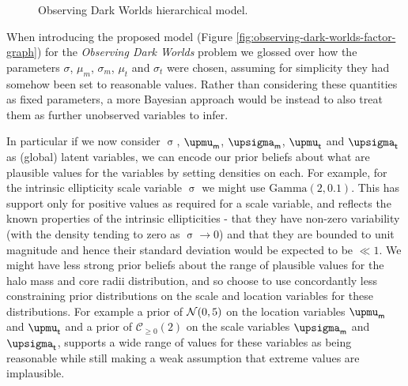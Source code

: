 \begin{figure}
\caption[Observing Dark Worlds hierarchical model.]{Observing Dark Worlds hierarchical model.} %
\label{fig:odw-hierarchical-factor-graph}
\end{figure}

When introducing the proposed model (Figure \ref{fig:observing-dark-worlds-factor-graph}) for the \emph{Observing Dark Worlds} problem we glossed over how the parameters $\sigma$, $\mu_m$, $\sigma_m$, $\mu_t$ and $\sigma_t$ were chosen, assuming for simplicity they had somehow been set to reasonable values. Rather than considering these quantities as fixed parameters, a more Bayesian approach would be instead to also treat them as further unobserved variables to infer.

In particular if we now consider $\upsigma$, $\upmu_{\rvar{m}}$, $\upsigma_{\rvar{m}}$, $\upmu_{\rvar{t}}$ and $\upsigma_{\rvar{t}}$ as (global) latent variables, we can encode our prior beliefs about what are plausible values for the variables by setting densities on each. For example, for the intrinsic ellipticity scale variable $\upsigma$ we might use $\mathrm{Gamma}(2,0.1)$. This has support only for positive values as required for a scale variable, and reflects the known properties of the intrinsic ellipticities - that they have non-zero variability (with the density tending to zero as $\upsigma \to 0$) and that they are bounded to unit magnitude and hence their standard deviation would be expected to be $ \ll 1$. We might have less strong prior beliefs about the range of plausible values for the halo mass and core radii distribution, and so choose to use concordantly less constraining prior distributions on the scale and location variables for these distributions. For example a prior of $\nrm{0, 5}$ on the location variables $\upmu_{\rvar{m}}$ and $\upmu_{\rvar{t}}$ and a prior of $\mathcal{C}_{\geq 0}(2)$ on the scale variables $\upsigma_{\rvar{m}}$ and $\upsigma_{\rvar{t}}$, supports a wide range of values for these variables as being reasonable while still making a weak assumption that extreme values are implausible.

